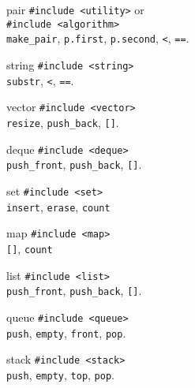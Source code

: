 \categorycontents{}
\newpage

\begin{algorithm}{pair}
\usage{}
{\tt \#include <utility>} or\\
{\tt \#include <algorithm>}\\
{\tt make\_pair}, {\tt p.first}, {\tt p.second}, {\tt <}, {\tt ==}.
\end{algorithm}

\begin{algorithm}{string}
\usage{}
{\tt \#include <string>}\\
{\tt substr}, {\tt <}, {\tt ==}.
\end{algorithm}

\begin{algorithm}{vector}
\usage{}
{\tt \#include <vector>}\\
{\tt resize}, {\tt push\_back}, {\tt []}.
\end{algorithm}

\begin{algorithm}{deque}
\usage{}
{\tt \#include <deque>}\\
{\tt push\_front}, {\tt push\_back}, {\tt []}.
\end{algorithm}

\begin{algorithm}{set}
\usage{}
{\tt \#include <set>}\\
{\tt insert}, {\tt erase}, {\tt count}
\end{algorithm}

\begin{algorithm}{map}
\usage{}
{\tt \#include <map>}\\
{\tt []}, {\tt count}
\end{algorithm}

\begin{algorithm}{list}
\usage{}
{\tt \#include <list>}\\
{\tt push\_front}, {\tt push\_back}, {\tt []}.
\end{algorithm}

\begin{algorithm}{queue}
\usage{}
{\tt \#include <queue>}\\
{\tt push}, {\tt empty}, {\tt front}, {\tt pop}.
\end{algorithm}

\begin{algorithm}{stack}
\usage{}
{\tt \#include <stack>}\\
{\tt push}, {\tt empty}, {\tt top}, {\tt pop}.
\end{algorithm}

